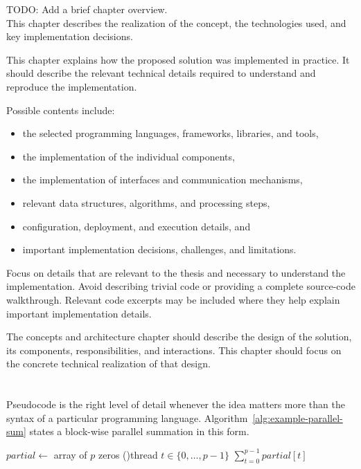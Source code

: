   {TODO: Add a brief chapter overview. \\
  This chapter describes the realization of the concept, the technologies used, and key implementation decisions.}


This chapter explains how the proposed solution was implemented in practice.
It should describe the relevant technical details required to understand and reproduce the implementation.

Possible contents include:
\begin{itemize}
  \item the selected programming languages, frameworks, libraries, and tools,
  \item the implementation of the individual components,
  \item the implementation of interfaces and communication mechanisms,
  \item relevant data structures, algorithms, and processing steps,
  \item configuration, deployment, and execution details, and
  \item important implementation decisions, challenges, and limitations.
\end{itemize}

Focus on details that are relevant to the thesis and necessary to understand the implementation.
Avoid describing trivial code or providing a complete source-code walkthrough.
Relevant code excerpts may be included where they help explain important implementation details.

The concepts and architecture chapter should describe the design of the solution, its components, responsibilities, and interactions.
This chapter should focus on the concrete technical realization of that design.

\section{}
\label{sec:example-algorithm}

Pseudocode is the right level of detail whenever the idea matters more than the syntax of a particular programming language.
Algorithm~\ref{alg:example-parallel-sum} states a block-wise parallel summation in this form.

\begin{algorithm}[htbp]
  $\mathit{partial} \gets$ array of $p$ zeros\;
  \ForEach(){thread $t \in \{0, \dots, p-1\}$}{
  }
  \Return $\sum_{t=0}^{p-1} \mathit{partial}[t]$\;
  \caption{}
  \label{alg:example-parallel-sum}
\end{algorithm}
